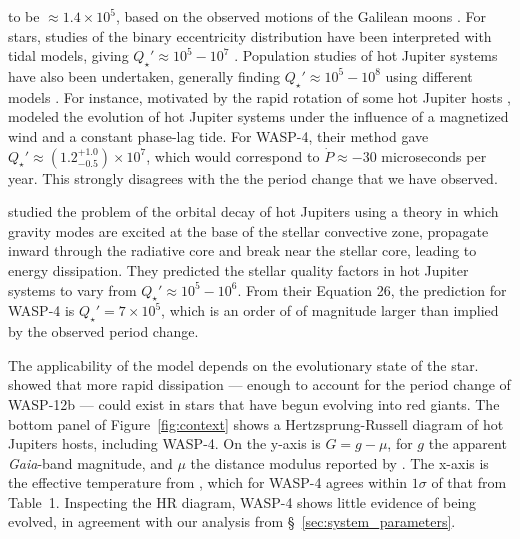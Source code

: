 \documentclass[12pt,twocolumn,tighten]{aastex62}
\begin{document}
to be $\approx$$1.4 \times 10^5$, based on the observed motions of the
Galilean moons \citep{lainey_strong_2009}.  For stars, studies of the
binary eccentricity distribution have been interpreted with tidal
models, giving $Q_\star' \approx 10^5 - 10^7$ \citep[{\it
e.g.},][]{meibom_robust_2005,belczynski_compact_2008,
geller_direct_2013,milliman_wiyn_2014}.  Population studies of hot
Jupiter systems have also been undertaken, generally finding $Q_\star'
\approx 10^5 - 10^8$ using different models
\citep{jackson_observational_2009,hansen_calibration_2010,penev_constraining_2012,penev_empirical_2018,cameron_hierarchical_2018}.
For instance, motivated by the rapid rotation of some hot Jupiter
hosts
\citep{pont_empirical_2009,ciceri_hats-15b_2016,penev_hats-18b_2016},
\citet{penev_empirical_2018} modeled the evolution of hot Jupiter
systems under the influence of a magnetized wind and a constant
phase-lag tide.  For WASP-4, their method gave $Q_\star' \approx
(1.2^{+1.0}_{-0.5})\times10^7$, which would correspond to $\dot{P}
\approx -30$ microseconds per year.  This strongly disagrees with the
the period change that we have observed.

\citet{essick_orbital_2016} studied the problem of the orbital decay
of hot Jupiters using a theory in which gravity modes are excited at
the base of the stellar convective zone, propagate inward through the
radiative core and break near the stellar core, leading to energy
dissipation.  They predicted the stellar quality factors in hot
Jupiter systems to vary from $Q_\star' \approx 10^5 - 10^6$.  From
their Equation 26, the prediction for WASP-4 is $Q_\star' =
7\times10^5$, which is an order of of magnitude larger than implied by
the observed period change.

The applicability of the \citet{essick_orbital_2016} model depends on
the evolutionary state of the star. \citet{weinberg_tidal_2017} showed
that more rapid dissipation --- enough to account for the period
change of WASP-12b --- could exist in stars that have begun evolving
into red giants.  The bottom panel of Figure~\ref{fig:context} shows a
Hertzsprung-Russell diagram of hot Jupiters hosts, including WASP-4.
On the y-axis is $G=g-\mu$, for $g$ the apparent {\it Gaia}-band magnitude,
and $\mu$ the distance modulus reported by
\citet{gaia_collaboration_gaia_2018}.  The x-axis is the effective
temperature from \citet{bonomo_gaps_2017}, which for WASP-4 agrees
within $1\sigma$ of that from Table~1.  Inspecting the HR diagram,
WASP-4 shows little evidence of being evolved, in agreement with our
analysis from \S~\ref{sec:system_parameters}.
\end{document}
